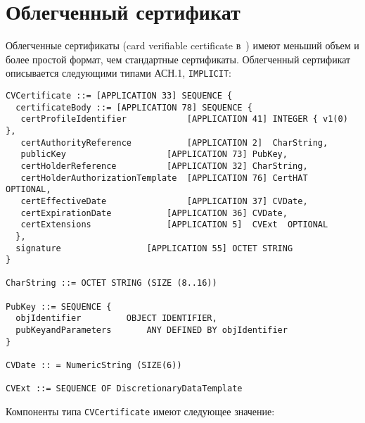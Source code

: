 \section{Облегченный сертификат}\label{CERTS.Light}

Облегченные сертификаты (card verifiable certificate в~\cite{LightCerts}) 
имеют меньший объем и более простой формат, чем стандартные сертификаты. 
Облегченный сертификат описывается следующими типами АСН.1,
 \verb|IMPLICIT|: 

\begin{verbatim}
CVCertificate ::= [APPLICATION 33] SEQUENCE {
  certificateBody ::= [APPLICATION 78] SEQUENCE {
   certProfileIdentifier			[APPLICATION 41] INTEGER { v1(0) },
   certAuthorityReference			[APPLICATION 2]  CharString,
   publicKey					[APPLICATION 73] PubKey,
   certHolderReference			[APPLICATION 32] CharString,
   certHolderAuthorizationTemplate	[APPLICATION 76] CertHAT  OPTIONAL,
   certEffectiveDate				[APPLICATION 37] CVDate,
   certExpirationDate			[APPLICATION 36] CVDate,
   certExtensions				[APPLICATION 5]  CVExt  OPTIONAL 
  },
  signature					[APPLICATION 55] OCTET STRING
}

CharString ::= OCTET STRING (SIZE (8..16))

PubKey ::= SEQUENCE {
  objIdentifier			OBJECT IDENTIFIER,
  pubKeyandParameters		ANY DEFINED BY objIdentifier
}

CVDate :: = NumericString (SIZE(6))

CVExt ::= SEQUENCE OF DiscretionaryDataTemplate
\end{verbatim}

Компоненты типа \verb|CVCertificate| имеют следующее значение:

